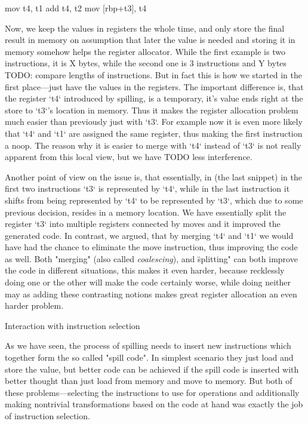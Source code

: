 \begtt
mov t4, t1
add t4, t2
mov [rbp+t3], t4
\endtt

Now, we keep the values in registers the whole time, and only store the final
result in memory on assumption that later the value is needed and storing it in
memory somehow helps the register allocator. While the first example is two
instructions, it is X bytes, while the second one is 3 instructions and Y bytes
TODO: compare lengths of instructions. But in fact this is how we started in the
first place---just have the values in the registers. The important difference
is, that the register `t4` introduced by spilling, is a temporary, it's value
ends right at the store to `t3`'s location in memory. Thus it makes the register
allocation problem much easier than previously just with `t3`. For example now
it is even more likely that `t4` and `t1` are assigned the same register, thus
making the first instruction a noop. The reason why it is easier to merge with
`t4` instead of `t3` is not really apparent from this local view, but we have
TODO less interference.

Another point of view on the issue is, that essentially, in (the last snippet)
in the first two instructions `t3` is represented by `t4`, while in the last
instruction it shifts from being represented by `t4` to be represented by `t3`,
which due to some previous decision, resides in a memory location. We have
essentially split the register `t3` into multiple registers connected by moves
and it improved the generated code. In contrast, we argued, that by merging `t4`
and `t1` we would have had the chance to eliminate the move instruction, thus
improving the code as well. Both "merging" (also called {\em coalescing}), and
\"splitting" can both improve the code in different situations, this makes it
even harder, because recklessly doing one or the other will make the code
certainly worse, while doing neither may as adding these contrasting notions
makes great register allocation an even harder problem.

\secc Interaction with instruction selection

As we have seen, the process of spilling needs to insert new instructions which
together form the so called "spill code". In simplest scenario they just load
and store the value, but better code can be achieved if the spill code is
inserted with better thought than just load from memory and move to memory. But
both of these problems---selecting the instructions to use for operations and
additionally making nontrivial transformations based on the code at hand was
exactly the job of instruction selection.

